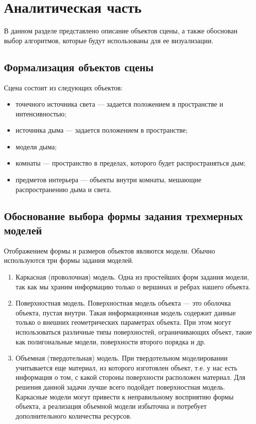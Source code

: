 \chapter{Аналитическая часть}

В данном разделе представлено описание объектов сцены, а также обоснован выбор алгоритмов, которые будут использованы для ее визуализации.

\section{Формализация объектов сцены}

Сцена состоит из следующих объектов:

\begin{itemize}[label=---]
	\item точечного источника света --- задается положением в пространстве и интенсивностью;
	\item источника дыма --- задается положением в пространстве;
	\item модели дыма;
	\item комнаты --- пространство в пределах, которого будет распространяться дым;
\item предметов интерьера --- объекты внутри комнаты, мешающие распространению дыма и света.
\end{itemize}

\section{Обоснование выбора формы задания трехмерных моделей}

Отображением формы и размеров объектов являются модели. Обычно используются три формы задания моделей.

\begin{enumerate}
	\item Каркасная (проволочная) модель.
	Одна из простейших форм задания модели, так как мы храним информацию только о вершинах и ребрах нашего объекта.
	\item Поверхностная модель.
	Поверхностная модель объекта — это оболочка объекта, пустая внутри. Такая информационная модель содержит данные только о внешних геометрических параметрах объекта. При этом могут использоваться различные типы поверхностей, ограничивающих объект, такие как полигональные модели, поверхности второго порядка и др.
	\item Объемная (твердотельная) модель.
	При твердотельном моделировании учитывается еще материал, из которого изготовлен объект, т.е. у нас есть информация о том, с какой стороны поверхности расположен материал.
	Для решения данной задачи лучше всего подойдет поверхностная модель. Каркасные модели могут привести к неправильному восприятию формы объекта, а реализация объемной модели избыточна и потребует дополнительного количества ресурсов.
\end{enumerate}

